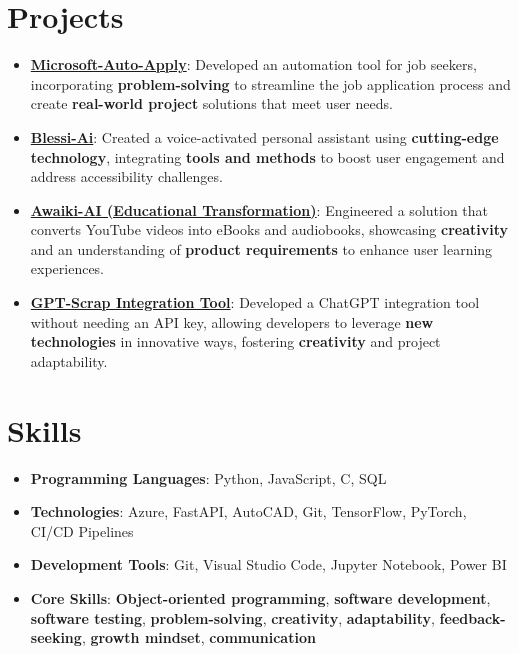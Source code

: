 \documentclass[letterpaper,11pt]{article}
\newcommand{\resumeItem}[2]{
  \item\small{
    \textbf{#1}{: #2 \vspace{-2pt}}
  }
}
\newcommand{\resumeSubItem}[2]{\resumeItem{#1}{#2}\vspace{-4pt}}
\newcommand{\resumeSubHeadingListStart}{\begin{itemize}[leftmargin=*]}
\newcommand{\resumeSubHeadingListEnd}{\end{itemize}}
\begin{document}
\section{Projects}
  \resumeSubHeadingListStart
    \resumeSubItem{\href{https://github.com/kashifalikhan36/MIcrosoft_autoearly_apply}{Microsoft-Auto-Apply}}
      {Developed an automation tool for job seekers, incorporating \textbf{problem-solving} to streamline the job application process and create \textbf{real-world project} solutions that meet user needs.}
      
    \resumeSubItem{\href{https://youtu.be/OyDJ7AkI3zU}{Blessi-Ai}}
      {Created a voice-activated personal assistant using \textbf{cutting-edge technology}, integrating \textbf{tools and methods} to boost user engagement and address accessibility challenges.}
      
    \resumeSubItem{\href{https://youtu.be/9uK548bL858}{Awaiki-AI (Educational Transformation)}}
      {Engineered a solution that converts YouTube videos into eBooks and audiobooks, showcasing \textbf{creativity} and an understanding of \textbf{product requirements} to enhance user learning experiences.}
    \resumeSubItem{\href{https://github.com/kashifalikhan36/Gpt-Scrap}{GPT-Scrap Integration Tool}}
      {Developed a ChatGPT integration tool without needing an API key, allowing developers to leverage \textbf{new technologies} in innovative ways, fostering \textbf{creativity} and project adaptability.}
  \resumeSubHeadingListEnd

\section{Skills}
 \resumeSubHeadingListStart
   \item \textbf{Programming Languages}: Python, JavaScript, C, SQL
   \item \textbf{Technologies}: Azure, FastAPI, AutoCAD, Git, TensorFlow, PyTorch, CI/CD Pipelines
   \item \textbf{Development Tools}: Git, Visual Studio Code, Jupyter Notebook, Power BI
   \item \textbf{Core Skills}: \textbf{Object-oriented programming}, \textbf{software development}, \textbf{software testing}, \textbf{problem-solving}, \textbf{creativity}, \textbf{adaptability}, \textbf{feedback-seeking}, \textbf{growth mindset}, \textbf{communication}
 \resumeSubHeadingListEnd

\end{document}
